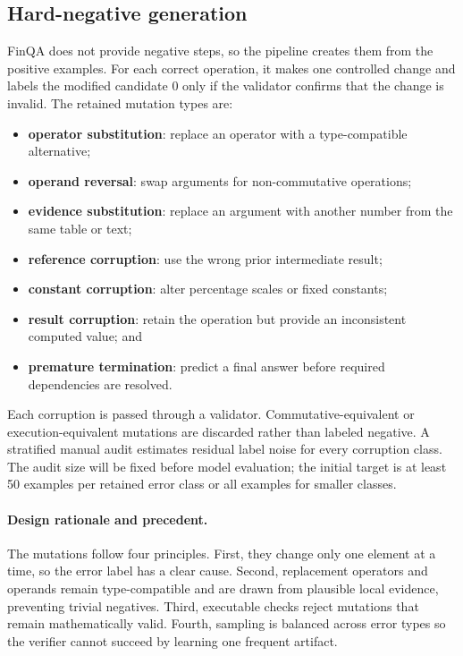 \documentclass[10pt,twocolumn]{article}
\begin{document}
\subsection{Hard-negative generation}
FinQA does not provide negative steps, so the pipeline creates them from the positive examples. For each correct operation, it makes one controlled change and labels the modified candidate 0 only if the validator confirms that the change is invalid. The retained mutation types are:
\begin{itemize}
  \item \textbf{operator substitution}: replace an operator with a type-compatible alternative;
  \item \textbf{operand reversal}: swap arguments for non-commutative operations;
  \item \textbf{evidence substitution}: replace an argument with another number from the same table or text;
  \item \textbf{reference corruption}: use the wrong prior intermediate result;
  \item \textbf{constant corruption}: alter percentage scales or fixed constants;
  \item \textbf{result corruption}: retain the operation but provide an inconsistent computed value; and
  \item \textbf{premature termination}: predict a final answer before required dependencies are resolved.
\end{itemize}

Each corruption is passed through a validator. Commutative-equivalent or execution-equivalent mutations are discarded rather than labeled negative. A stratified manual audit estimates residual label noise for every corruption class. The audit size will be fixed before model evaluation; the initial target is at least 50 examples per retained error class or all examples for smaller classes.

\paragraph{Design rationale and precedent.}
The mutations follow four principles. First, they change only one element at a time, so the error label has a clear cause. Second, replacement operators and operands remain type-compatible and are drawn from plausible local evidence, preventing trivial negatives. Third, executable checks reject mutations that remain mathematically valid. Fourth, sampling is balanced across error types so the verifier cannot succeed by learning one frequent artifact.
\end{document}
